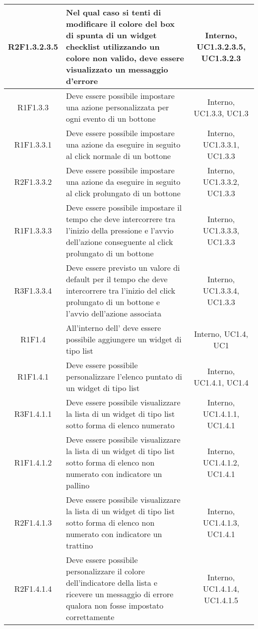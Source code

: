 \begin{longtable}{|c|>{\centering}m{7cm}|c|}
		\hline
		R2F1.3.2.3.5 & Nel qual caso si tenti di modificare il colore del box di spunta di un widget checklist utilizzando un colore non valido, deve essere visualizzato un messaggio d'errore & Interno, UC1.3.2.3.5, UC1.3.2.3 \\
		\hline
			R1F1.3.3 & Deve essere possibile impostare una azione personalizzata per ogni evento di un bottone & Interno, UC1.3.3, UC1.3 \\
			\hline
		R1F1.3.3.1 & Deve essere possibile impostare una azione da eseguire in seguito al click normale di un bottone & Interno, UC1.3.3.1, UC1.3.3\\ 
		\hline
		R2F1.3.3.2 & Deve essere possibile impostare una azione da eseguire in seguito al click prolungato di un bottone & Interno, UC1.3.3.2, UC1.3.3\\ 
		\hline
		R1F1.3.3.3 & Deve essere possibile impostare il tempo che deve intercorrere tra l'inizio della pressione e l'avvio dell'azione conseguente al click prolungato di un bottone & Interno, UC1.3.3.3, UC1.3.3\\ 
		\hline
		R3F1.3.3.4 & Deve essere previsto un valore di default per il tempo che deve intercorrere tra l'inizio del click prolungato di un bottone e l'avvio dell'azione associata & Interno, UC1.3.3.4, UC1.3.3\\ 
		\hline
		R1F1.4 & All'interno dell'\termine{SDK} deve essere possibile aggiungere un widget di tipo list & Interno, UC1.4, UC1 \\ 
		\hline
		R1F1.4.1 & Deve essere possibile personalizzare l'elenco puntato di un widget di tipo list & Interno, UC1.4.1, UC1.4 \\
		\hline
		R3F1.4.1.1 & Deve essere possibile visualizzare la lista di un widget di tipo list sotto forma di elenco numerato & Interno, UC1.4.1.1, UC1.4.1 \\
		\hline
		R1F1.4.1.2 & Deve essere possibile visualizzare la lista di un widget di tipo list sotto forma di elenco non numerato con indicatore un pallino & Interno, UC1.4.1.2, UC1.4.1 \\
		\hline
		R2F1.4.1.3 & Deve essere possibile visualizzare la lista di un widget di tipo list sotto forma di elenco non numerato con indicatore un trattino & Interno, UC1.4.1.3, UC1.4.1 \\
		\hline
		R2F1.4.1.4 & Deve essere possibile personalizzare il colore dell'indicatore della lista e ricevere un messaggio di errore qualora non fosse impostato correttamente & Interno, UC1.4.1.4, UC1.4.1.5 \\

\end{longtable}
